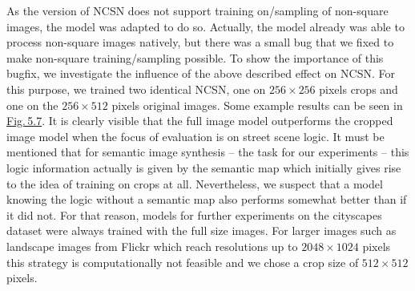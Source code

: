 As the version of NCSN \cite{score_3} does not support training on/sampling of non-square images, the model was adapted to do so. Actually, the model already was able to process non-square images natively, but there was a small bug that we fixed to make non-square training/sampling possible. To show the importance of this bugfix, we investigate the influence of the above described effect on NCSN. For this purpose, we trained two identical NCSN, one on $256\times256$ pixels crops and one on the $256\times512$ pixels original images. Some example results can be seen in \hyperref[fig:5.7]{Fig.\,5.7}. It is clearly visible that the full image model outperforms the cropped image model when the focus of evaluation is on street scene logic. It must be mentioned that for semantic image synthesis – the task for our experiments – this logic information actually is given by the semantic map which initially gives rise to the idea of training on crops at all. Nevertheless, we suspect that a model knowing the logic without a semantic map also performs somewhat better than if it did not. For that reason, models for further experiments on the cityscapes dataset were always trained with the full size images. For larger images such as landscape images from Flickr which reach resolutions up to $2048\times1024$ pixels this strategy is computationally not feasible and we chose a crop size of $512\times512$ pixels.
